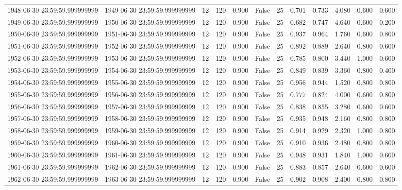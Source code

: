 \begin{table}
\begin{tabular}{lccccccccccc}
1948-06-30 23:59:59.999999999 & 1949-06-30 23:59:59.999999999 & 12 & 120 & 0.900 & False & 25 & 0.701 & 0.733 & 4.080 & 0.600 & 0.600 \\
1949-06-30 23:59:59.999999999 & 1950-06-30 23:59:59.999999999 & 12 & 120 & 0.900 & False & 25 & 0.682 & 0.747 & 4.640 & 0.600 & 0.200 \\
1950-06-30 23:59:59.999999999 & 1951-06-30 23:59:59.999999999 & 12 & 120 & 0.900 & False & 25 & 0.937 & 0.964 & 1.760 & 0.600 & 0.800 \\
1951-06-30 23:59:59.999999999 & 1952-06-30 23:59:59.999999999 & 12 & 120 & 0.900 & False & 25 & 0.892 & 0.889 & 2.640 & 0.800 & 0.600 \\
1952-06-30 23:59:59.999999999 & 1953-06-30 23:59:59.999999999 & 12 & 120 & 0.900 & False & 25 & 0.785 & 0.800 & 3.440 & 1.000 & 0.600 \\
1953-06-30 23:59:59.999999999 & 1954-06-30 23:59:59.999999999 & 12 & 120 & 0.900 & False & 25 & 0.849 & 0.839 & 3.360 & 0.800 & 0.400 \\
1954-06-30 23:59:59.999999999 & 1955-06-30 23:59:59.999999999 & 12 & 120 & 0.900 & False & 25 & 0.956 & 0.944 & 1.520 & 0.800 & 0.800 \\
1955-06-30 23:59:59.999999999 & 1956-06-30 23:59:59.999999999 & 12 & 120 & 0.900 & False & 25 & 0.777 & 0.824 & 4.000 & 0.600 & 0.800 \\
1956-06-30 23:59:59.999999999 & 1957-06-30 23:59:59.999999999 & 12 & 120 & 0.900 & False & 25 & 0.838 & 0.855 & 3.280 & 0.600 & 0.600 \\
1957-06-30 23:59:59.999999999 & 1958-06-30 23:59:59.999999999 & 12 & 120 & 0.900 & False & 25 & 0.935 & 0.948 & 2.160 & 0.800 & 0.800 \\
1958-06-30 23:59:59.999999999 & 1959-06-30 23:59:59.999999999 & 12 & 120 & 0.900 & False & 25 & 0.914 & 0.929 & 2.320 & 1.000 & 0.800 \\
1959-06-30 23:59:59.999999999 & 1960-06-30 23:59:59.999999999 & 12 & 120 & 0.900 & False & 25 & 0.910 & 0.936 & 2.480 & 0.800 & 0.800 \\
1960-06-30 23:59:59.999999999 & 1961-06-30 23:59:59.999999999 & 12 & 120 & 0.900 & False & 25 & 0.948 & 0.931 & 1.840 & 1.000 & 0.600 \\
1961-06-30 23:59:59.999999999 & 1962-06-30 23:59:59.999999999 & 12 & 120 & 0.900 & False & 25 & 0.883 & 0.857 & 2.640 & 0.600 & 0.600 \\
1962-06-30 23:59:59.999999999 & 1963-06-30 23:59:59.999999999 & 12 & 120 & 0.900 & False & 25 & 0.902 & 0.908 & 2.400 & 0.800 & 0.800 \\

\end{tabular}
\end{table}
